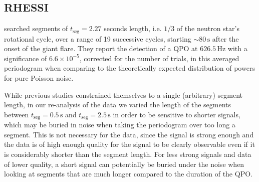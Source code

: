 \documentclass{emulateapj}
\begin{document}
\subsection{RHESSI}
\label{sec:rhessi_results}

\citealt{Watts06} searched segments of $t_{\mathrm{seg}} = 2.27$ seconds length, i.e. $1/3$ of the neutron star's rotational cycle, over a range of 19 successive cycles, starting $\sim 80 \, \mathrm{s}$ after the onset of the giant flare. They report the detection of a QPO at $626.5 \, \mathrm{Hz}$ with a significance of $6.6 \times 10^{-5}$, corrected for the number of trials, in this averaged periodogram when comparing to the theoretically expected distribution of powers for pure Poisson noise.

While previous studies constrained themselves to a single (arbitrary) segment length, in our re-analysis of the \rhessi data we varied the length of the segments between $t_{\mathrm{seg}} = 0.5 \, \mathrm{s}$ and $t_{\mathrm{seg}} = 2.5 \, \mathrm{s}$  in order to be sensitive to shorter signals, which may be buried in noise when taking the periodogram over too long a segment. This is not necessary for the \rxte data, since the signal is strong enough and the data is of high enough quality for the signal to be clearly observable even if it is considerably shorter than the segment length. For less strong signals and data of lower quality, a short signal can potentially be buried under the noise when looking at segments that are much longer compared to the duration of the QPO. 
\end{document}
